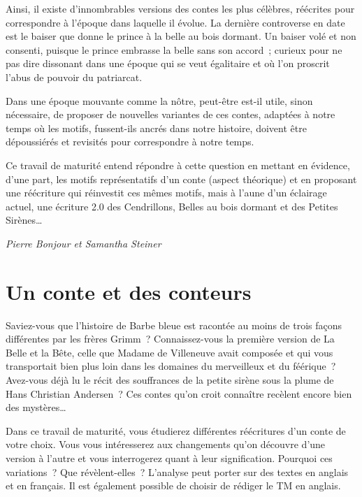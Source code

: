 \documentclass[
  10pt,
  french,
  a5paper,
  openany]{book}
\newenvironment{signature}{\begin{flushright}}{\end{flushright}}
\begin{document}
Ainsi, il existe d'innombrables versions des contes les plus célèbres, réécrites pour correspondre à l'époque dans laquelle il évolue. La dernière controverse en date est le baiser que donne le prince à la belle au bois dormant. Un baiser volé et non consenti, puisque le prince embrasse la belle sans son accord~; curieux pour ne pas dire dissonant dans une époque qui se veut égalitaire et où l'on proscrit l'abus de pouvoir du patriarcat.

Dans une époque mouvante comme la nôtre, peut-être est-il utile, sinon nécessaire, de proposer de nouvelles variantes de ces contes, adaptées à notre temps où les motifs, fussent-ils ancrés dans notre histoire, doivent être dépoussiérés et revisités pour correspondre à notre temps.

Ce travail de maturité entend répondre à cette question en mettant en évidence, d'une part, les motifs représentatifs d'un conte (aspect théorique) et en proposant une réécriture qui réinvestit ces mêmes motifs, mais à l'aune d'un éclairage actuel, une écriture 2.0 des Cendrillons, Belles au bois dormant et des Petites Sirènes\ldots{}

\begin{signature}
\emph{Pierre Bonjour et Samantha Steiner}

\end{signature}

\hypertarget{un-conte-et-des-conteurs}{%
\chapter{Un conte et des conteurs}\label{un-conte-et-des-conteurs}}

Saviez-vous que l'histoire de Barbe bleue est racontée au moins de trois façons différentes par les frères Grimm~? Connaissez-vous la première version de La Belle et la Bête, celle que Madame de Villeneuve avait composée et qui vous transportait bien plus loin dans les domaines du merveilleux et du féérique~? Avez-vous déjà lu le récit des souffrances de la petite sirène sous la plume de Hans Christian Andersen~? Ces contes qu'on croit connaître recèlent encore bien des mystères\ldots{}

Dans ce travail de maturité, vous étudierez différentes réécritures d'un conte de votre choix. Vous vous intéresserez aux changements qu'on découvre d'une version à l'autre et vous interrogerez quant à leur signification. Pourquoi ces variations~? Que révèlent-elles~? L'analyse peut porter sur des textes en anglais et en français. Il est également possible de choisir de rédiger le TM en anglais.
\end{document}
